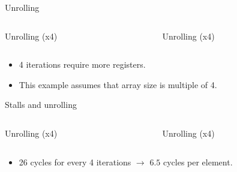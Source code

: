 \begin{frame}[t]{Unrolling}

\begin{columns}

\begin{column}{.45\textwidth}
\begin{block}{Unrolling (x4)}

\end{block}
\end{column}

\begin{column}{.45\textwidth}
\begin{block}{Unrolling (x4)}

\end{block}
\end{column}

\end{columns}
\begin{itemize}
  \item 4 iterations require more registers.
  \item This example assumes that array size is multiple of 4.
\end{itemize}
\end{frame}

\begin{frame}[t,shrink=10]{Stalls and unrolling}

\begin{columns}

\begin{column}{.45\textwidth}
\begin{block}{Unrolling (x4)}

\end{block}
\end{column}

\begin{column}{.45\textwidth}
\begin{block}{Unrolling (x4)}

\end{block}
\end{column}

\end{columns}
\begin{itemize}
  \item 26 cycles for every 4 iterations $\rightarrow$ $6.5$ cycles per element.
\end{itemize}
\end{frame}

